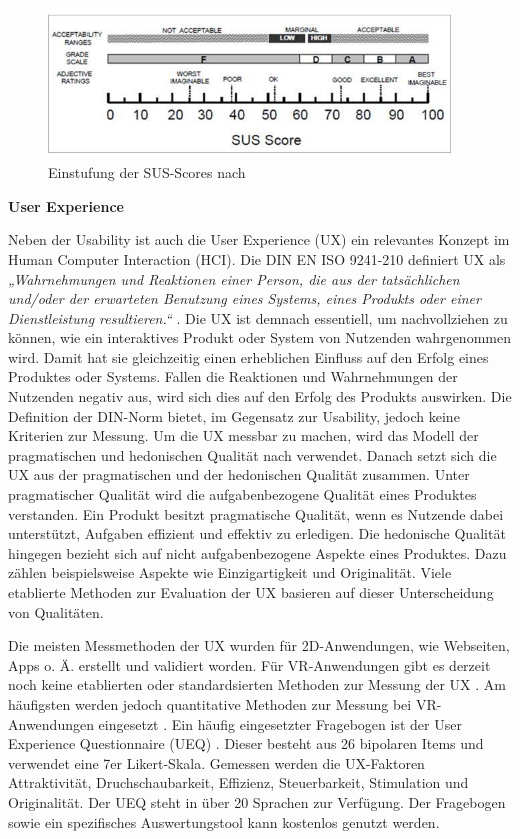 \begin{figure}[tbh]
    \centering
    \includegraphics[width=0.95\textwidth]{images/SUS-Interpretation.jpg}
    \caption{Einstufung der SUS-Scores nach \citet{bangor_empirical_2008}}
    \label{fig:susInterpretation}
\end{figure}

\textbf{User Experience}

Neben der Usability ist auch die User Experience (UX) ein relevantes Konzept im Human Computer Interaction (HCI). Die DIN EN ISO 9241-210 definiert UX als \textit{„Wahrnehmungen und Reaktionen einer Person, die aus der tatsächlichen und/oder der erwarteten Benutzung eines Systems, eines Produkts oder einer Dienstleistung resultieren.“} \citep{DINISO9241}. Die UX ist demnach essentiell, um nachvollziehen zu können, wie ein interaktives Produkt oder System von Nutzenden wahrgenommen wird. Damit hat sie gleichzeitig einen erheblichen Einfluss auf den Erfolg eines Produktes oder Systems. Fallen die Reaktionen und Wahrnehmungen der Nutzenden negativ aus, wird sich dies auf den Erfolg des Produkts auswirken. Die Definition der DIN-Norm bietet, im Gegensatz zur Usability, jedoch keine Kriterien zur Messung. Um die UX messbar zu machen, wird das Modell der pragmatischen und hedonischen Qualität nach \citet{hassenzahl_user_2008} verwendet. Danach setzt sich die UX aus der pragmatischen und der hedonischen Qualität zusammen. Unter pragmatischer Qualität wird die aufgabenbezogene Qualität eines Produktes verstanden. Ein Produkt besitzt pragmatische Qualität, wenn es Nutzende dabei unterstützt, Aufgaben effizient und effektiv zu erledigen. Die hedonische Qualität hingegen bezieht sich auf nicht aufgabenbezogene Aspekte eines Produktes. Dazu zählen beispielsweise Aspekte wie Einzigartigkeit und Originalität. Viele etablierte Methoden zur Evaluation der UX basieren auf dieser Unterscheidung von Qualitäten. 

Die meisten Messmethoden der UX wurden für 2D-Anwendungen, wie Webseiten, Apps o. Ä. erstellt und validiert worden. Für VR-Anwendungen gibt es derzeit noch keine etablierten oder standardsierten Methoden zur Messung der UX \citep{alexandrovsky_evaluating_2021}. Am häufigsten werden jedoch quantitative Methoden zur Messung bei VR-Anwendungen eingesetzt \citep{kim_systematic_2020}. Ein häufig eingesetzter Fragebogen ist der User Experience Questionnaire (UEQ) \citep{laugwitz_construction_2008}. Dieser besteht aus 26 bipolaren Items und verwendet eine 7er Likert-Skala. Gemessen werden die UX-Faktoren Attraktivität, Druchschaubarkeit, Effizienz, Steuerbarkeit, Stimulation und Originalität. Der UEQ steht in über 20 Sprachen zur Verfügung. Der Fragebogen sowie ein spezifisches Auswertungstool kann kostenlos genutzt werden. 

